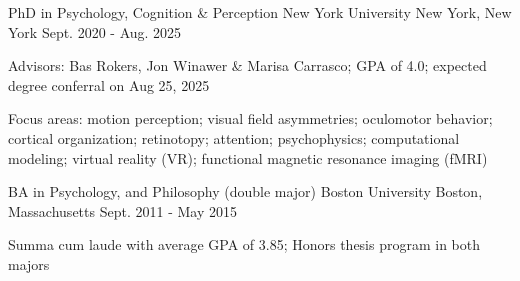 \begin{cventries}
  \cventry
    {PhD in Psychology, Cognition \& Perception}
    {New York University}
    {New York, New York}
    {Sept. 2020 - Aug. 2025}
    {
      \begin{cvitems}
       \item {Advisors: Bas Rokers, Jon Winawer \& Marisa Carrasco; GPA of 4.0; expected degree conferral on Aug 25, 2025}
       \item {Focus areas: motion perception; visual field asymmetries; oculomotor behavior; cortical organization; retinotopy; attention; psychophysics; computational modeling; virtual reality (VR); functional magnetic resonance imaging (fMRI)}
      \end{cvitems}
    }
  \cventry
    {BA in Psychology, and Philosophy (double major)}
    {Boston University}
    {Boston, Massachusetts}
    {Sept. 2011 - May 2015}
    {
      \begin{cvitems}
       \item {Summa cum laude with average GPA of 3.85; Honors thesis program in both majors}
      \end{cvitems}
    }
\end{cventries}   

